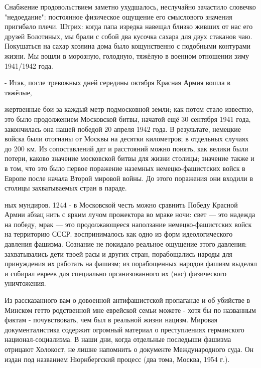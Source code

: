 
\label{242-1}
Снабжение продовольствием заметно ухудшалось, неслучайно зачастило словечко "недоедание": постоянное физическое ощущение его смыслового значения пригибало плечи. Штрих: когда папа изредка навещал близко живших от нас его друзей Болотиных, мы брали с собой два кусочка сахара для двух стаканов чаю. Покушаться на сахар хозяина дома было кощунственно с подобными контурами жизни. Мы вошли в морозную, голодную, тяжёлую в военном отношении зиму 1941/1942 года.

- Итак, после тревожных дней середины октября Красная Армия вошла в тяжёлые,

\label{243-1}
жертвенные бои за каждый метр подмосковной земли; как потом стало известно, это было продолжением Московской битвы, начатой ещё 30 сентября 1941 года, закончилась она нашей победой 20 апреля 1942 года. В результате, немецкие войска были отогнаны от Москвы на десятки километров; в отдельных случаях до 200 км. Из сопоставлений дат и расстояний можно понять, как велики были потери, каково значение московской битвы для жизни столицы; значение также и в том, что это было первое поражение наземных немецко-фашистских войск в Европе после начала Второй мировой войны. До этого поражения они входили в столицы захватываемых стран в параде.

\label{244-1}
ных мундиров. 1244 - в Московской честь можно сравнить Победу Красной Армии абзац нить с ярким лучом прожектора во мраке ночи: свет — это надежда на победу, мрак — это продолжающееся наползание немецко-фашистских войск на территорию СССР. воспринималось как одно из форм идеологического давления фашизма. Сознание не покидало реальное ощущение этого давления: захватывались дети твоей расы и других стран, порабощались народы для принуждения их работать на фашизм; из порабощенных народов фашизм выделял и собирал евреев для специально организованного их (нас) физического уничтожения.

\label{245-1}
Из рассказанного вам о довоенной антифашистской пропаганде и об убийстве в Минском гетто родственной мне еврейской семьи можете - хотя бы по названным фактам - почувствовать, чем был в реальной жизни нацизм. Мировая документалистика содержит огромный материал о преступлениях германского национал-социализма.
В наши дни, когда отдельные последыши фашизма отрицают Холокост, не лишне напомнить о документе Международного суда. Он издан под названием Нюрнбергский процесс (два тома, Москва, 1954 г.).

